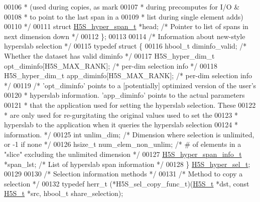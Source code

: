 \begin{DoxyCode}
00106 \textcolor{comment}{                                             * (used during copies, as mark}
00107 \textcolor{comment}{                                             * during precomputes for I/O &}
00108 \textcolor{comment}{                                             * to point to the last span in a}
00109 \textcolor{comment}{                                             * list during single element adds)}
00110 \textcolor{comment}{                                             */}
00111     \textcolor{keyword}{struct }\hyperlink{struct_h5_s__hyper__span__t}{H5S\_hyper\_span\_t} *head;  \textcolor{comment}{/* Pointer to list of spans in next dimension down */}
00112 \};
00113 
00114 \textcolor{comment}{/* Information about new-style hyperslab selection */}
00115 \textcolor{keyword}{typedef} \textcolor{keyword}{struct }\{
00116     hbool\_t diminfo\_valid;                      \textcolor{comment}{/* Whether the dataset has valid diminfo */}
00117     H5S\_hyper\_dim\_t opt\_diminfo[H5S\_MAX\_RANK];  \textcolor{comment}{/* per-dim selection info */}
00118     H5S\_hyper\_dim\_t app\_diminfo[H5S\_MAX\_RANK];  \textcolor{comment}{/* per-dim selection info */}
00119     \textcolor{comment}{/* 'opt\_diminfo' points to a [potentially] optimized version of the user's}
00120 \textcolor{comment}{         * hyperslab information.  'app\_diminfo' points to the actual parameters}
00121 \textcolor{comment}{         * that the application used for setting the hyperslab selection.  These}
00122 \textcolor{comment}{         * are only used for re-gurgitating the original values used to set the}
00123 \textcolor{comment}{         * hyperslab to the application when it queries the hyperslab selection}
00124 \textcolor{comment}{         * information. */}
00125     \textcolor{keywordtype}{int} unlim\_dim;                              \textcolor{comment}{/* Dimension where selection is unlimited, or -1 if none */}
00126     hsize\_t num\_elem\_non\_unlim;                 \textcolor{comment}{/* # of elements in a "slice" excluding the unlimited
       dimension */}
00127     \hyperlink{struct_h5_s__hyper__span__info__t}{H5S\_hyper\_span\_info\_t} *span\_lst; \textcolor{comment}{/* List of hyperslab span information */}
00128 \} \hyperlink{struct_h5_s__hyper__sel__t}{H5S\_hyper\_sel\_t};
00129 
00130 \textcolor{comment}{/* Selection information methods */}
00131 \textcolor{comment}{/* Method to copy a selection */}
00132 \textcolor{keyword}{typedef} herr\_t (*H5S\_sel\_copy\_func\_t)(\hyperlink{struct_h5_s__t}{H5S\_t} *dst, \textcolor{keyword}{const} \hyperlink{struct_h5_s__t}{H5S\_t} *src, hbool\_t share\_selection);

\end{DoxyCode}
